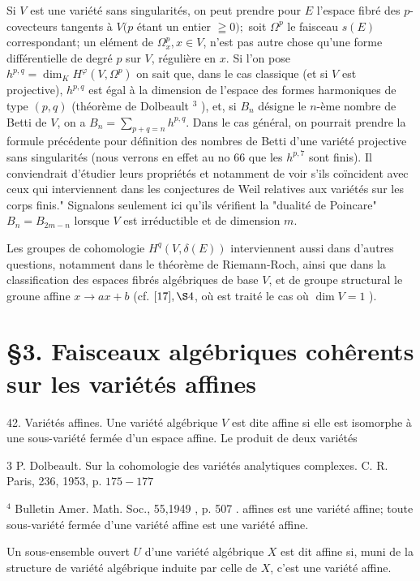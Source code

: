 Si $V$ est une variété sans singularités, on peut prendre pour $E$ l'espace fibré des $p$-covecteurs tangents à $V(p$ étant un entier $\geqq 0) ;$ soit $\Omega^{p}$ le faisceau $s(E)$ correspondant; un elément de $\Omega_{x}^{p}, x \in V$, n'est pas autre chose qu'une forme différentielle de degré $p$ sur $V$, régulière en $x$. Si l'on pose $h^{p, q}=\operatorname{dim}_{K} H^{\varphi}\left(V, \Omega^{p}\right)$ on sait que, dans le cas classique (et si $V$ est projective), $h^{p, q}$ est égal à la dimension de l'espace des formes harmoniques de type $(p, q)$ (théorème de Dolbeault $^{3}$ ), et, si $B_{n}$ désigne le $n$-ème nombre de Betti de $V$, on a $B_{n}=\sum_{p+q=n} h^{p, q}$. Dans le cas général, on pourrait prendre la formule précédente pour définition des nombres de Betti d'une variété projective sans singularités (nous verrons en effet au no 66 que les $h^{p, 7}$ sont finis). Il conviendrait d'étudier leurs propriétés et notamment de voir s'ils coïncident avec ceux qui interviennent dans les conjectures de Weil relatives aux variétés sur les corps finis." Signalons seulement ici qu'ils vérifient la "dualité de Poincare" $B_{n}=B_{2 m-n}$ lorsque $V$ est irréductible et de dimension $m$.

Les groupes de cohomologie $H^{q}(V, \delta(E))$ interviennent aussi dans d'autres questions, notamment dans le théorème de Riemann-Roch, ainsi que dans la classification des espaces fibrés algébriques de base $V$, et de groupe structural le groune affine $x \rightarrow a x+b$ (cf. $[17], \S 4$, où est traité le cas où $\operatorname{dim} V=1$ ).

\section{§3. Faisceaux algébriques cohêrents sur les variétés affines}

42. Variétés affines. Une variété algébrique $V$ est dite affine si elle est isomorphe à une sous-variété fermée d'un espace affine. Le produit de deux variétés

3 P. Dolbeault. Sur la cohomologie des variétés analytiques complexes. C. R. Paris, 236, 1953, p. $175-177$

${ }^{4}$ Bulletin Amer. Math. Soc., 55,1949 , p. 507 . affines est une variété affine; toute sous-variété fermée d'une variété affine est une variété affine.

Un sous-ensemble ouvert $U$ d'une variété algébrique $X$ est dit affine si, muni de la structure de variété algébrique induite par celle de $X$, c'est une variété affine.

